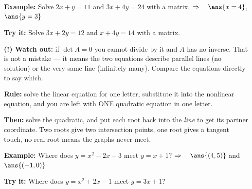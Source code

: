 \documentclass[12pt]{article}
\begin{document}
\begin{examplebox}
\textbf{Example:} Solve $2x + y = 11$ and $3x + 4y = 24$ with a matrix.
$\Rightarrow\quad \ans{x = 4}$, $\ans{y = 3}$
\end{examplebox}

\begin{tryitbox}
\textbf{Try it:} Solve $3x + 2y = 12$ and $x + 4y = 14$ with a matrix.\\[2pt]
\end{tryitbox}

\begin{watchoutbox}
\textbf{(!) Watch out:} if $\det A = 0$ you cannot divide by it and $A$ has no inverse.
That is not a mistake --- it means the two equations describe parallel lines
(no solution) or the very same line (infinitely many). Compare the equations directly
to say which.
\end{watchoutbox}


\begin{formulabox}
\textbf{Rule:} solve the linear equation for one letter, substitute it into the
nonlinear equation, and you are left with ONE quadratic equation in one letter.\par
\textbf{Then:} solve the quadratic, and put each root back into the \emph{line} to get
its partner coordinate. Two roots give two intersection points, one root gives a
tangent touch, no real root means the graphs never meet.
\end{formulabox}

\begin{examplebox}
\textbf{Example:} Where does $y = x^2 - 2x - 3$ meet $y = x + 1$?
$\Rightarrow\quad \ans{(4,5)}$ and $\ans{(-1,0)}$
\end{examplebox}

\begin{tryitbox}
\textbf{Try it:} Where does $y = x^2 + 2x - 1$ meet $y = 3x + 1$?\\[2pt]
\end{tryitbox}
\end{document}
